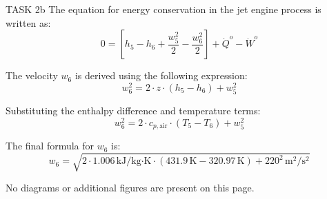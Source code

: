 TASK 2b  
The equation for energy conservation in the jet engine process is written as:  
\[
0 = \left[ h_5 - h_6 + \frac{w_5^2}{2} - \frac{w_6^2}{2} \right] + \dot{Q}^o - \dot{W}^o
\]  

The velocity \( w_6 \) is derived using the following expression:  
\[
w_6^2 = 2 \cdot z \cdot (h_5 - h_6) + w_5^2
\]  

Substituting the enthalpy difference and temperature terms:  
\[
w_6^2 = 2 \cdot c_{p,\text{air}} \cdot (T_5 - T_6) + w_5^2
\]  

The final formula for \( w_6 \) is:  
\[
w_6 = \sqrt{2 \cdot 1.006 \, \text{kJ/kg·K} \cdot (431.9 \, \text{K} - 320.97 \, \text{K}) + 220^2 \, \text{m}^2/\text{s}^2}
\]  

No diagrams or additional figures are present on this page.